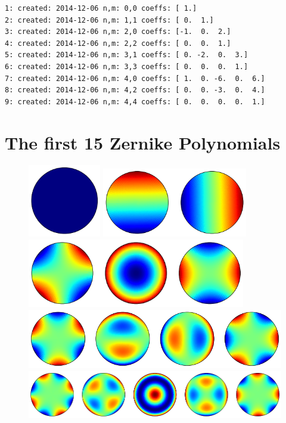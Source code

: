 \documentclass{tufte-handout}
\begin{document}
\begin{verbatim}
1: created: 2014-12-06 n,m: 0,0 coeffs: [ 1.]
2: created: 2014-12-06 n,m: 1,1 coeffs: [ 0.  1.]
3: created: 2014-12-06 n,m: 2,0 coeffs: [-1.  0.  2.]
4: created: 2014-12-06 n,m: 2,2 coeffs: [ 0.  0.  1.]
5: created: 2014-12-06 n,m: 3,1 coeffs: [ 0. -2.  0.  3.]
6: created: 2014-12-06 n,m: 3,3 coeffs: [ 0.  0.  0.  1.]
7: created: 2014-12-06 n,m: 4,0 coeffs: [ 1.  0. -6.  0.  6.]
8: created: 2014-12-06 n,m: 4,2 coeffs: [ 0.  0. -3.  0.  4.]
9: created: 2014-12-06 n,m: 4,4 coeffs: [ 0.  0.  0.  0.  1.]
\end{verbatim}

\pagebreak

\section{The first 15 Zernike Polynomials}


\begin{figure}[ht]
\centering
\includegraphics[width=1.25in]{img/orthogonal_polynomials_15_0.png}

\includegraphics[width=2.5in]{img/orthogonal_polynomials_15_1.png}

\includegraphics[width=3.75in]{img/orthogonal_polynomials_15_2.png}

\includegraphics[width=5in]{img/orthogonal_polynomials_15_3.png}

\includegraphics[width=6.25in]{img/orthogonal_polynomials_15_4.png}
\end{figure}
\end{document}
